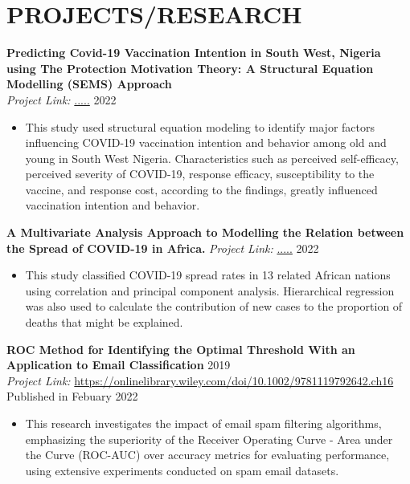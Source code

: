 \documentclass[a4paper,9pt]{extarticle}
\begin{document}
\section*{PROJECTS/RESEARCH}
\noindent
\textbf{Predicting Covid-19 Vaccination Intention in South West, Nigeria using The Protection Motivation Theory: A Structural Equation Modelling (SEMS) Approach } \hfill \\ %
\textit{Project Link:} \url{.....} \hfill 2022 %
\begin{itemize}[topsep=0pt, partopsep=0pt, itemsep=0pt, parsep=0pt]
    \item This study used structural equation modeling to identify major factors influencing COVID-19 vaccination intention and behavior among old and young in South West Nigeria. Characteristics such as perceived self-efficacy, perceived severity of COVID-19, response efficacy, susceptibility to the vaccine, and response cost, according to the findings, greatly influenced vaccination intention and behavior.%
\end{itemize}
\noindent
\textbf{A Multivariate Analysis Approach to Modelling the Relation between the Spread of COVID-19 in Africa.}  %
\textit{Project Link:} \url{.....} \hfill 2022 %
\begin{itemize}[topsep=0pt, partopsep=0pt, itemsep=0pt, parsep=0pt]
    \item This study classified COVID-19 spread rates in 13 related African nations using correlation and principal component analysis. Hierarchical regression was also used to calculate the contribution of new cases to the proportion of deaths that might be explained. %
\end{itemize}
\noindent
\textbf{ROC Method for Identifying the Optimal Threshold With an Application to Email Classification } \hfill 2019\\ %
\textit{Project Link:} \url{https://onlinelibrary.wiley.com/doi/10.1002/9781119792642.ch16} \hfill Published in Febuary 2022 %
\begin{itemize}[topsep=0pt, partopsep=0pt, itemsep=0pt, parsep=0pt]
    \item This research investigates the impact of email spam filtering algorithms, emphasizing the superiority of the Receiver Operating Curve - Area under the Curve (ROC-AUC) over accuracy metrics for evaluating performance, using extensive experiments conducted on spam email datasets. %
\end{itemize}

\end{document}
